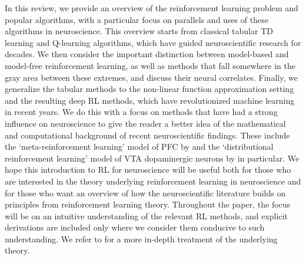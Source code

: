 In this review, we provide an overview of the reinforcement learning problem and popular algorithms, with a particular focus on parallels and uses of these algorithms in neuroscience.
This overview starts from classical tabular TD learning and Q-learning algorithms, which have guided neuroscientific research for decades.
We then consider the important distinction between model-based and model-free reinforcement learning, as well as methods that fall somewhere in the gray area between these extremes, and discuss their neural correlates.
Finally, we generalize the tabular methods to the non-linear function approximation setting and the resulting deep RL methods, which have revolutionized machine learning in recent years.
We do this with a focus on methods that have had a strong influence on neuroscience to give the reader a better idea of the mathematical and computational background of recent neuroscientific findings.
These include the `meta-reinforcement learning' model of PFC by \citet{wang2018prefrontal} and the `distributional reinforcement learning' model of VTA dopaminergic neurons by \citet{dabney2020distributional} in particular.
We hope this introduction to RL for neuroscience will be useful both for those who are interested in the theory underlying reinforcement learning in neuroscience and for those who want an overview of how the neuroscientific literature builds on principles from reinforcement learning theory.
Throughout the paper, the focus will be on an intuitive understanding of the relevant RL methods, and explicit derivations are included only where we consider them conducive to such understanding.
We refer to \citet{sutton2018reinforcement} for a more in-depth treatment of the underlying theory.


